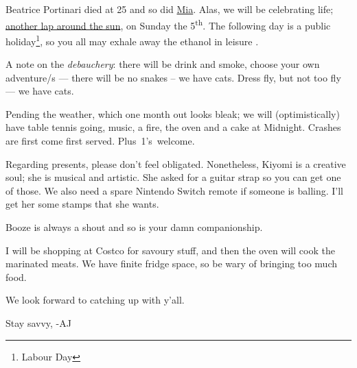 \documentclass[dvipsnames]{article}
\begin{document}
Beatrice Portinari died at 25 and so did \href{https://abaj.ai/blog/mia/}{Mia}. Alas, we will be celebrating life; \href{https://frizzande.io/articles/thirty_three/}{another lap around the sun}, on Sunday the 5\textsuperscript{th}. The following day is a public holiday\footnote{Labour Day}, so you all may exhale away the ethanol in leisure .

A note on the \emph{debauchery}: there will be drink and smoke, choose your own adventure/s --- there will be no snakes -- we have cats. Dress fly, but not too fly --- we have cats.

Pending the weather, which one month out looks bleak; we will (optimistically) have table tennis going, music, a fire, the oven and a cake at Midnight. Crashes are first come first served. \mbox{\color{MidnightBlue}Plus 1's welcome.}

Regarding presents, please don't feel obligated. Nonetheless, Kiyomi is a creative soul; she is musical and artistic. She asked for a guitar strap so you can get one of those. We also need a spare Nintendo Switch remote if someone is balling. I'll get her some stamps that she wants.

Booze is always a shout and so is your damn companionship.

I will be shopping at Costco for savoury stuff, and then the oven will cook the marinated meats. We have finite fridge space, so be wary of bringing too much food.

We look forward to catching up with y'all. 

Stay savvy,
-AJ
\end{document}
